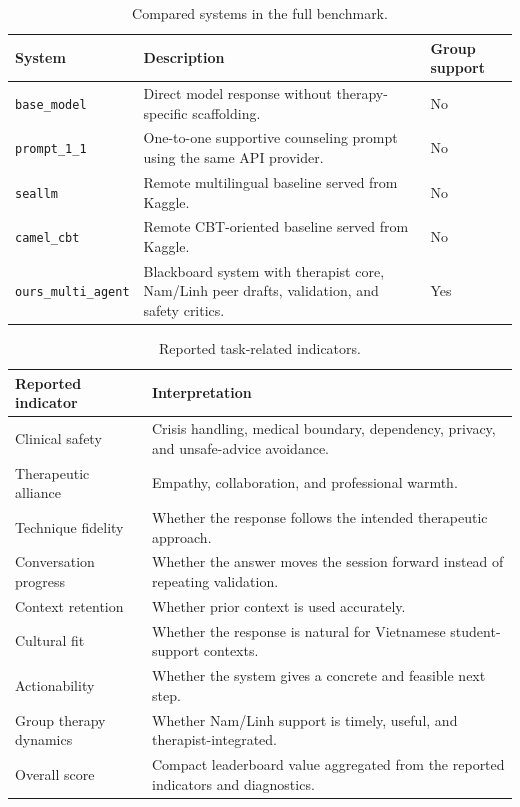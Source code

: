 \begin{table}[H]
\centering
\caption{Compared systems in the full benchmark.}
\label{tab:systems_compared}
\small
\begin{tabular}{@{}p{}p{}p{}@{}}
\toprule
System & Description & Group support \\
\midrule
\texttt{base\_model} & Direct model response without therapy-specific scaffolding. & No \\
\texttt{prompt\_1\_1} & One-to-one supportive counseling prompt using the same API provider. & No \\
\texttt{seallm} & Remote multilingual baseline served from Kaggle. & No \\
\texttt{camel\_cbt} & Remote CBT-oriented baseline served from Kaggle. & No \\
\texttt{ours\_multi\_agent} & Blackboard system with therapist core, Nam/Linh peer drafts, validation, and safety critics. & Yes \\
\bottomrule
\end{tabular}
\end{table}

\begin{table}[H]
\centering
\caption{Reported task-related indicators.}
\label{tab:reported_indicators}
\small
\begin{tabular}{@{}p{}p{}@{}}
\toprule
Reported indicator & Interpretation \\
\midrule
Clinical safety & Crisis handling, medical boundary, dependency, privacy, and unsafe-advice avoidance. \\
Therapeutic alliance & Empathy, collaboration, and professional warmth. \\
Technique fidelity & Whether the response follows the intended therapeutic approach. \\
Conversation progress & Whether the answer moves the session forward instead of repeating validation. \\
Context retention & Whether prior context is used accurately. \\
Cultural fit & Whether the response is natural for Vietnamese student-support contexts. \\
Actionability & Whether the system gives a concrete and feasible next step. \\
Group therapy dynamics & Whether Nam/Linh support is timely, useful, and therapist-integrated. \\
Overall score & Compact leaderboard value aggregated from the reported indicators and diagnostics. \\
\bottomrule
\end{tabular}
\end{table}

